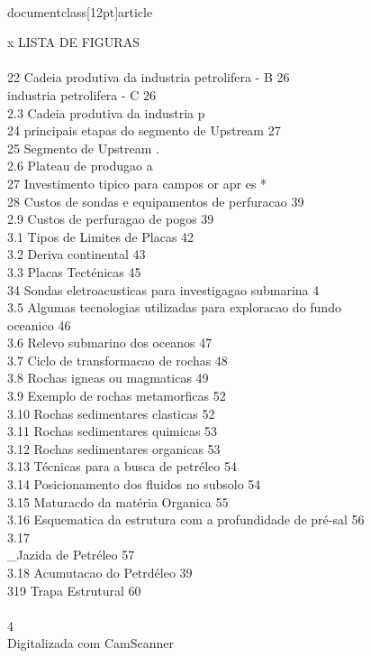 \\documentclass[12pt]{article}
\begin{document}
x LISTA DE FIGURAS\\
\\
22 Cadeia produtiva da industria petrolifera - B 26\\
industria petrolifera - C 26\\
2.3 Cadeia produtiva da industria p\\
24 principais etapas do segmento de Upstream 27\\
25 Segmento de Upstream .\\
2.6 Plateau de produgao a\\
27 Investimento tipico para campos or apr es *\\
28 Custos de sondas e equipamentos de perfuracao 39\\
2.9 Custos de perfuragao de pogos 39\\
3.1 Tipos de Limites de Placas 42\\
3.2 Deriva continental 43\\
3.3 Placas Tecténicas 45\\
34 Sondas eletroacusticas para investigagao submarina 4\\%
3.5 Algumas tecnologias utilizadas para exploracao do fundo\\
oceanico 46\\
3.6 Relevo submarino dos oceanos 47\\
3.7 Ciclo de transformacao de rochas 48\\
3.8 Rochas igneas ou magmaticas 49\\
3.9 Exemplo de rochas metamorficas 52\\
3.10 Rochas sedimentares clasticas 52\\
3.11 Rochas sedimentares quimicas 53\\
3.12 Rochas sedimentares organicas 53\\
3.13 Técnicas para a busca de petréleo 54\\
3.14 Posicionamento dos fluidos no subsolo 54\\
3.15 Maturacdo da matéria Organica 55\\
3.16 Esquematica da estrutura com a profundidade de pré-sal 56\\
3.17 \\_Jazida de Petréleo 57\\
3.18 Acumutacao do Petrdéleo 39\\
319 Trapa Estrutural 60\\
\\
4\\
Digitalizada com CamScanner\\
\end{document}
